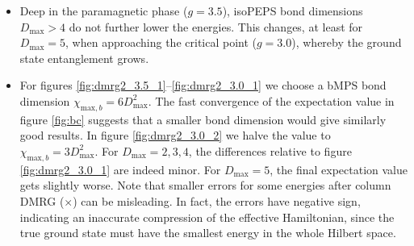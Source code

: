 \begin{itemize}
	\item Deep in the paramagnetic phase ($g = 3.5$), isoPEPS bond dimensions $D_{\text{max}} > 4$ do not further lower the energies. This changes, at least for $D_{\text{max}} = 5$, when approaching the critical point ($g = 3.0$), whereby the ground state entanglement grows. 
	\item For figures \ref{fig:dmrg2_3.5_1}--\ref{fig:dmrg2_3.0_1} we choose a bMPS bond dimension $\chi_{\text{max}, b} = 6D_{\text{max}}^2$. The fast convergence of the expectation value in figure \ref{fig:bc} suggests that a smaller bond dimension would give similarly good results. In figure \ref{fig:dmrg2_3.0_2} we halve the value to $\chi_{\text{max}, b} = 3D_{\text{max}}^2$. For  $D_{\text{max}} = 2, 3, 4$, the differences relative to figure \ref{fig:dmrg2_3.0_1} are indeed minor. For  $D_{\text{max}} = 5$, the final expectation value gets slightly worse. Note that smaller errors for some energies after column DMRG ($\times$) can be misleading. In fact, the errors have negative sign, indicating an inaccurate compression of the effective Hamiltonian, since the true ground state must have the smallest energy in the whole Hilbert space.
\end{itemize}

